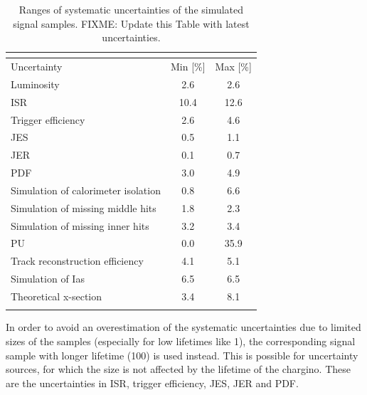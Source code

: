 \renewcommand{\arraystretch}{1.5}
\begin{table}[!h] 
\centering
\caption{Ranges of systematic uncertainties of the simulated signal samples. FIXME: Update this Table with latest uncertainties.}
\label{tab:SignalSysUnc}
\begin{tabular}{|l|c|c|}  
\multicolumn{3}{c}{} \\
\toprule
Uncertainty                             &Min [\%]           &Max [\%]           \\ 
\midrule
Luminosity                              &2.6                &2.6                \\ 
ISR                                     &10.4               &12.6               \\ 
Trigger efficiency                      &2.6                &4.6                \\ 
JES                                     &0.5                &1.1                \\ 
JER                                     &0.1                &0.7                \\ 
PDF                                     &3.0                &4.9                \\ 
Simulation of calorimeter isolation     &0.8                &6.6                \\ 
Simulation of missing middle hits       &1.8                &2.3                \\ 
Simulation of missing inner hits        &3.2                &3.4                \\ 
PU                                      &0.0                &35.9               \\ 
Track reconstruction efficiency         &4.1                &5.1                \\ 
Simulation of Ias                       &6.5                &6.5                \\ 
Theoretical x-section                   &3.4                &8.1                \\ 
\bottomrule
\multicolumn{3}{c}{} \\
\end{tabular}  
\end{table} 

In order to avoid an overestimation of the systematic uncertainties due to limited sizes of the samples (especially for low lifetimes like 1\cm), the corresponding signal sample with longer lifetime (100\cm) is used instead.
This is possible for uncertainty sources, for which the size is not affected by the lifetime of the chargino.
These are the uncertainties in ISR, trigger efficiency, JES, JER and PDF.

